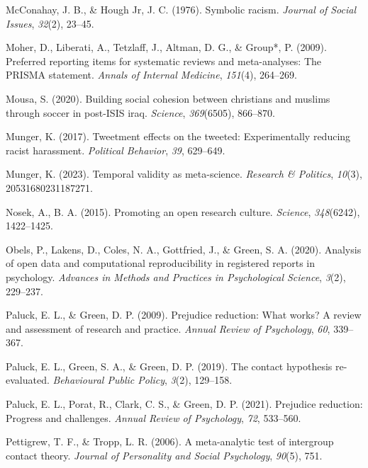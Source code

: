 \documentclass[
  man]{apa6}
\newlength{\cslhangindent}
\newenvironment{CSLReferences}[2] %
 {\begin{list}{}{%
  \setlength{\itemindent}{0pt}
  \setlength{\leftmargin}{0pt}
  \setlength{\parsep}{0pt}
  \ifodd #1
   \setlength{\leftmargin}{\cslhangindent}
   \setlength{\itemindent}{-1\cslhangindent}
  \fi
  \setlength{\itemsep}{#2\baselineskip}}}
 {\end{list}}
\begin{document}
\begin{CSLReferences}{1}{0}
McConahay, J. B., \& Hough Jr, J. C. (1976). Symbolic racism. \emph{Journal of Social Issues}, \emph{32}(2), 23--45.

Moher, D., Liberati, A., Tetzlaff, J., Altman, D. G., \& Group*, P. (2009). Preferred reporting items for systematic reviews and meta-analyses: The PRISMA statement. \emph{Annals of Internal Medicine}, \emph{151}(4), 264--269.

Mousa, S. (2020). Building social cohesion between christians and muslims through soccer in post-ISIS iraq. \emph{Science}, \emph{369}(6505), 866--870.

Munger, K. (2017). Tweetment effects on the tweeted: Experimentally reducing racist harassment. \emph{Political Behavior}, \emph{39}, 629--649.

Munger, K. (2023). Temporal validity as meta-science. \emph{Research \& Politics}, \emph{10}(3), 20531680231187271.

Nosek, A., B. A. (2015). Promoting an open research culture. \emph{Science}, \emph{348}(6242), 1422--1425.

Obels, P., Lakens, D., Coles, N. A., Gottfried, J., \& Green, S. A. (2020). Analysis of open data and computational reproducibility in registered reports in psychology. \emph{Advances in Methods and Practices in Psychological Science}, \emph{3}(2), 229--237.

Paluck, E. L., \& Green, D. P. (2009). Prejudice reduction: What works? A review and assessment of research and practice. \emph{Annual Review of Psychology}, \emph{60}, 339--367.

Paluck, E. L., Green, S. A., \& Green, D. P. (2019). The contact hypothesis re-evaluated. \emph{Behavioural Public Policy}, \emph{3}(2), 129--158.

Paluck, E. L., Porat, R., Clark, C. S., \& Green, D. P. (2021). Prejudice reduction: Progress and challenges. \emph{Annual Review of Psychology}, \emph{72}, 533--560.

Pettigrew, T. F., \& Tropp, L. R. (2006). A meta-analytic test of intergroup contact theory. \emph{Journal of Personality and Social Psychology}, \emph{90}(5), 751.


\end{CSLReferences}
\end{document}

